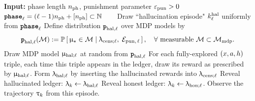 \begin{algorithm}[h]
  	\begin{algorithmic}[1]
  	\State{}\textbf{Input: }
        phase length $n_{\mathrm{ph}}$,
        punishment parameter $\varepsilon_{\mathrm{pun}}>0$
    \State{}${\normalfont \texttt{\textbf{phase}}}_{\ell} = (\ell-1) n_{\mathrm{ph}}  + [n_{\mathrm{ph}}] \subset \mathbb{N}$
        ~~~
    \State{}Draw ``hallucination episode" $k^{\mathrm{hal}}_{\ell}$ uniformly from ${\normalfont \texttt{\textbf{phase}}}_{\ell}$
    \State{}
    \State{}Define distribution ${\normalfont \texttt{\textbf{p}}}_{\mathrm{hal},\ell}$ over MDP models by
        \begin{align}\label{eq:algo-halposterior-defn}
         {\normalfont \texttt{\textbf{p}}}_{\mathrm{hal},\ell}(\mathcal{M}) := \operatorname{\mathbb{P}}\left[\,\upmu_{\star} \in \mathcal{M} \mid \uplambda_{\mathrm{cens};\ell},\; \mathcal{E}_{\mathrm{pun},\,\ell}\,\right],
            \quad\forall \text{ measurable }\mathcal{M}\subset\mathcal{M}_{\mathrm{mdp}}.
         \end{align}
    \State{}Draw MDP model $\upmu_{\mathrm{hal};\ell}$ at random from ${\normalfont \texttt{\textbf{p}}}_{\mathrm{hal},\ell}$\label{line:modhall}
     \State{}For each fully-explored $(x,a,h)$ triple,
     \State{}\hspace{2em}each time this triple appears in the ledger,
     \State{}\hspace{2em}draw its reward as prescribed by $\upmu_{\mathrm{hal};\ell}$.
     \State{}Form $\uplambda_{\mathrm{hal};\ell}$ by inserting the hallucinated rewards into $\uplambda_{\mathrm{cens};\ell}$
     \State{}Reveal hallucinated ledger: $\uplambda_{k} \gets \uplambda_{\mathrm{hal};\ell}$
    \Else{} 
     \State{}Reveal honest ledger: $\uplambda_{k} \gets \uplambda_{\mathrm{hon};\ell}$.
    \EndIf
    \State{}Observe the trajectory ${\uptau}_k$ from this episode.
  \EndFor
  \EndFor
  \end{algorithmic}
  \caption{\mdphh}
  \label{alg:MDP_HH}
	\end{algorithm}


